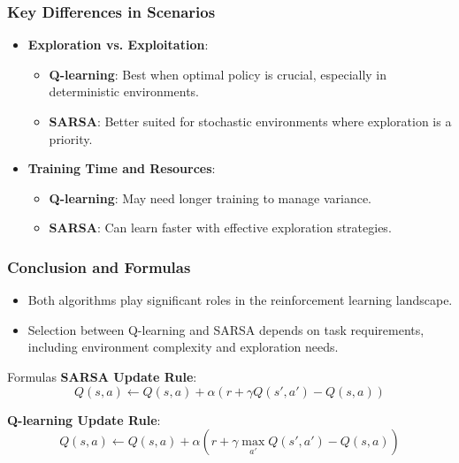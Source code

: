 \documentclass[aspectratio=169]{beamer}
\begin{document}
\begin{frame}[fragile]
    \frametitle{Key Differences in Scenarios}
    \begin{itemize}
        \item \textbf{Exploration vs. Exploitation}:
        \begin{itemize}
            \item \textbf{Q-learning}: Best when optimal policy is crucial, especially in deterministic environments.
            \item \textbf{SARSA}: Better suited for stochastic environments where exploration is a priority.
        \end{itemize}
        \item \textbf{Training Time and Resources}:
        \begin{itemize}
            \item \textbf{Q-learning}: May need longer training to manage variance.
            \item \textbf{SARSA}: Can learn faster with effective exploration strategies.
        \end{itemize}
    \end{itemize}
\end{frame}

\begin{frame}[fragile]
    \frametitle{Conclusion and Formulas}
    \begin{itemize}
        \item Both algorithms play significant roles in the reinforcement learning landscape.
        \item Selection between Q-learning and SARSA depends on task requirements, including environment complexity and exploration needs.
    \end{itemize}

    \begin{block}{Formulas}
        \textbf{SARSA Update Rule}:
        \begin{equation}
        Q(s, a) \leftarrow Q(s, a) + \alpha \left( r + \gamma Q(s', a') - Q(s, a) \right)
        \end{equation}

        \textbf{Q-learning Update Rule}:
        \begin{equation}
        Q(s, a) \leftarrow Q(s, a) + \alpha \left( r + \gamma \max_{a'} Q(s', a') - Q(s, a) \right)
        \end{equation}
    \end{block}
\end{frame}
\end{document}
